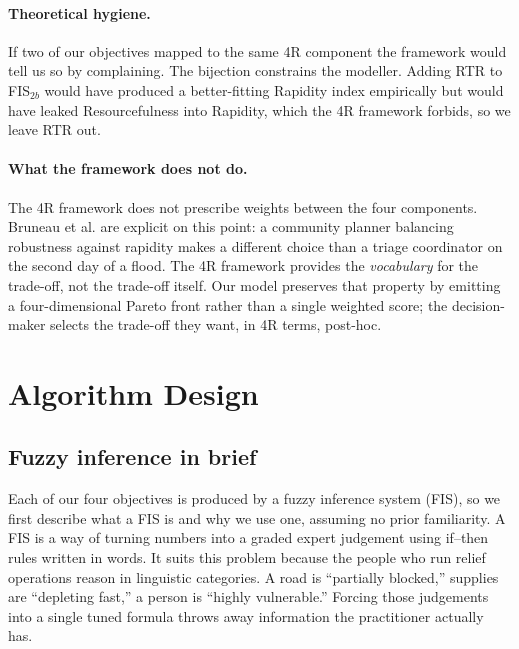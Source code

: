 \documentclass[applsci,article,submit,moreauthors,pdftex]{Definitions/mdpi}
\begin{document}
\paragraph{Theoretical hygiene.} If two of our objectives mapped to the same
4R component the framework would tell us so by complaining. The bijection
constrains the modeller. Adding RTR to FIS$_{2b}$ would have produced a
better-fitting Rapidity index empirically but would have leaked
Resourcefulness into Rapidity, which the 4R framework forbids, so we leave
RTR out.

\paragraph{What the framework does not do.} The 4R framework does not
prescribe weights between the four components. Bruneau et al.
\cite{bruneau2003} are explicit on this point: a community planner balancing
robustness against rapidity makes a different choice than a triage
coordinator on the second day of a flood. The 4R framework provides the
\emph{vocabulary} for the trade-off, not the trade-off itself. Our model
preserves that property by emitting a four-dimensional Pareto front rather
than a single weighted score; the decision-maker selects the trade-off they
want, in 4R terms, post-hoc.

\section{Algorithm Design}\label{sec:algorithms}

\subsection{Fuzzy inference in brief}\label{sec:algo-fis-primer}

Each of our four objectives is produced by a fuzzy inference system (FIS), so
we first describe what a FIS is and why we use one, assuming no prior
familiarity. A FIS is a way of turning numbers into a graded expert judgement
using if--then rules written in words. It suits this problem because the people
who run relief operations reason in linguistic categories. A road is
``partially blocked,'' supplies are ``depleting fast,'' a person is ``highly
vulnerable.'' Forcing those judgements into a single tuned formula throws
away information the practitioner actually has.
\end{document}
